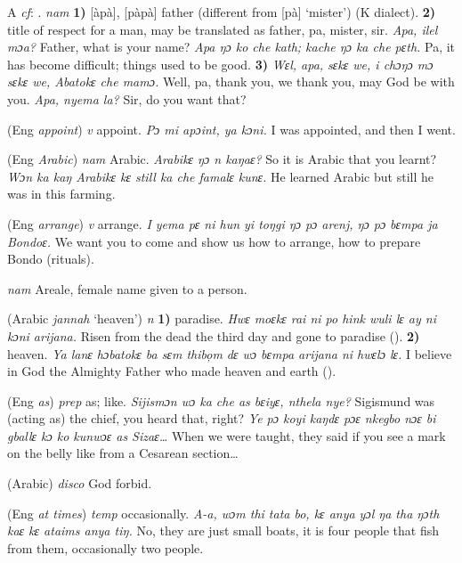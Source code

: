 \begin{letter}{A}
 \textit{cf}: . \textit{nam} \textbf{1)} [àpà], [pàpà] father (different from [pà] ‘mister') (K dialect). \textbf{2)} title of respect for a man, may be translated as father, pa, mister, sir. \textit{Apa, ilel mɔa?} Father, what is your name? \textit{Apa ŋɔ ko che kath; kache ŋɔ ka che pɛth.} Pa, it has become difficult; things used to be good. \textbf{3)} \textit{Wɛl, apa, sɛkɛ we, i chɔŋɔ mɔ sɛkɛ we, Abatokɛ che mamɔ.} Well, pa, thank you, we thank you, may God be with you. \textit{Apa, nyema la?} Sir, do you want that?

 (Eng \textit{appoint}) \textit{v} appoint. \textit{Pɔ mi apɔint, ya kɔni.} I was appointed, and then I went.

 (Eng \textit{Arabic}) \textit{nam} Arabic. \textit{Arabikɛ ŋɔ n kaŋaɛ?} So it is Arabic that you learnt? \textit{Wɔn ka kaŋ Arabikɛ kɛ still ka che famalɛ kunɛ.} He learned Arabic but still he was in this farming.

 (Eng \textit{arrange}) \textit{v} arrange. \textit{I yema pɛ ni hun yi toŋgi ŋɔ pɔ arenj, ŋɔ pɔ bɛmpa ja Bondoɛ.} We want you to come and show us how to arrange, how to prepare Bondo (rituals).

 \textit{nam} Areale, female name given to a person.

 (Arabic { } \textit{jannah} ‘heaven') \textit{n} \textbf{1)} paradise. \textit{Hwɛ moɛkɛ rai ni po hink wuli lɛ ay ni kɔni arijana.} Risen from the dead the third day and gone to paradise (\citealt{Pichl1967}). \textbf{2)} heaven. \textit{Ya lanɛ hɔbatokɛ ba sɛm thibo̦m dɛ wɔ bɛmpa arijana ni hwɛlɔ lɛ.} I believe in God the Almighty Father who made heaven and earth (\citealt{Pichl1967}).

 (Eng \textit{as}) \textit{prep} as; like. \textit{Sijismɔn wɔ ka che as bɛiyɛ, nthela nye?} Sigismund was (acting as) the chief, you heard that, right? \textit{Ye pɔ koyi kaŋdɛ pɔɛ nkegbo nɔɛ bi gballɛ kɔ ko kunwɔɛ as Sizaɛ…} When we were taught, they said if you see a mark on the belly like from a Cesarean section…

 (Arabic) \textit{disco} God forbid.

 (Eng \textit{at times}) \textit{temp} occasionally. \textit{A-a, wɔm thi tata bo, kɛ anya yɔl ŋa tha ŋɔth kaɛ kɛ ataims anya tiŋ.} No, they are just small boats, it is four people that fish from them, occasionally two people.


\end{letter}
